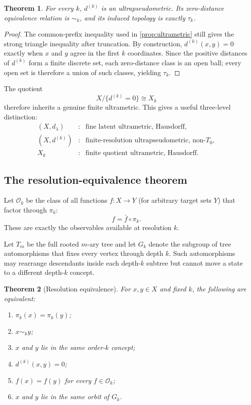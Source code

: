 \documentclass[11pt]{article}
\newtheorem{theorem}{Theorem}[section]
\theoremstyle{definition}
\theoremstyle{remark}
\newcommand{\Obs}{\mathcal O}
\begin{document}
\begin{theorem}\label{thm:pseudo}
For every $k$, $d^{(k)}$ is an ultrapseudometric.  Its zero-distance equivalence relation is $\sim_k$, and its induced topology is exactly $\tau_k$.
\end{theorem}

\begin{proof}
The common-prefix inequality used in \cref{prop:ultrametric} still gives the strong triangle inequality after truncation.  By construction, $d^{(k)}(x,y)=0$ exactly when $x$ and $y$ agree in the first $k$ coordinates.  Since the positive distances of $d^{(k)}$ form a finite discrete set, each zero-distance class is an open ball; every open set is therefore a union of such classes, yielding $\tau_k$.
\end{proof}

The quotient
\[
X/\{d^{(k)}=0\}\cong X_k
\]
therefore inherits a genuine finite ultrametric.  This gives a useful three-level distinction:
\[
\begin{array}{ccl}
(X,d_\lambda)&:&\text{fine latent ultrametric, Hausdorff},\\
(X,d^{(k)})&:&\text{finite-resolution ultrapseudometric, non-$T_0$},\\
X_k&:&\text{finite quotient ultrametric, Hausdorff}.
\end{array}
\]

\subsection{The resolution-equivalence theorem}

Let $\Obs_k$ be the class of all functions $f:X\to Y$ (for arbitrary target sets $Y$) that factor through $\pi_k$:
\[
f=\bar f\circ\pi_k.
\]
These are exactly the observables available at resolution $k$.

Let $T_m$ be the full rooted $m$-ary tree and let $G_k$ denote the subgroup of tree automorphisms that fixes every vertex through depth $k$.  Such automorphisms may rearrange descendants inside each depth-$k$ subtree but cannot move a state to a different depth-$k$ concept.

\begin{theorem}[Resolution equivalence]\label{thm:equiv}
For $x,y\in X$ and fixed $k$, the following are equivalent:
\begin{enumerate}[label=(\roman*)]
\item $\pi_k(x)=\pi_k(y)$;
\item $x\sim_k y$;
\item $x$ and $y$ lie in the same order-$k$ concept;
\item $d^{(k)}(x,y)=0$;
\item $f(x)=f(y)$ for every $f\in\Obs_k$;
\item $x$ and $y$ lie in the same orbit of $G_k$.
\end{enumerate}
\end{theorem}
\end{document}
